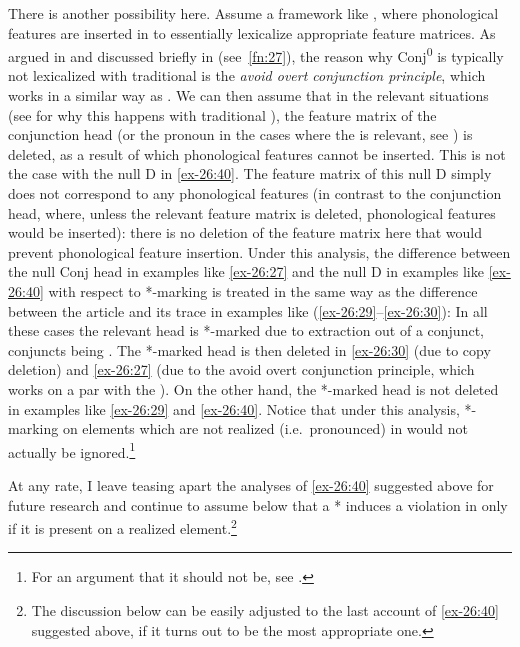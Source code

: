 \documentclass[output=paper]{langsci/langscibook}
\begin{document}
There is another possibility here. Assume a framework like , where phonological features are inserted in  to
essentially lexicalize appropriate feature matrices. As argued in
\textcite{Progovac1998,Progovac1999} and discussed briefly in 
(see~\cref{fn:27}), the reason why Conj\textsuperscript{0} is typically not
lexicalized with traditional  is the \emph{avoid overt conjunction
principle}, which works in a similar way as  . We can then assume that in the relevant situations (see
 for why this happens with traditional ), the
feature matrix of the conjunction head (or the pronoun in the cases where the
 is relevant, see \citealt{Holmberg2005}) is
deleted, as a result of which phonological features cannot be inserted. This is
not the case with the null D in \eqref{ex-26:40}. The feature matrix of this
null D simply does not correspond to any phonological features (in contrast to
the conjunction head, where, unless the relevant feature matrix is deleted,
phonological features would be inserted): there is no deletion of the feature
matrix here that would prevent phonological feature insertion.  Under this
analysis, the difference between the null Conj head in examples like
\eqref{ex-26:27} and the null D in examples like \eqref{ex-26:40} with respect
to *-marking is treated in the same way as the difference between the article
and its trace in  examples like (\ref{ex-26:29}--\ref{ex-26:30}):
In all these cases the relevant head is *-marked due to extraction out of a
conjunct, conjuncts being .  The *-marked head is then deleted in
\eqref{ex-26:30} (due to copy deletion) and \eqref{ex-26:27} (due to the avoid
overt conjunction principle, which works on a par with the ).  On the other hand, the *-marked head is not deleted in examples
like \eqref{ex-26:29} and \eqref{ex-26:40}.  Notice that under this analysis,
*-marking on elements which are not realized (i.e.\ pronounced) in
 would not actually be ignored.\footnote{For an argument that
it should not be, see \textcite{Boskovic2011}.}

At any rate, I leave teasing apart the analyses of \eqref{ex-26:40} suggested above for
future research and continue to assume below that a * induces a violation in
 only if it is present on a  realized
element.\footnote{The discussion below can be easily adjusted to the last
account of \eqref{ex-26:40} suggested above, if it turns out to be the most appropriate
one.}
\end{document}
